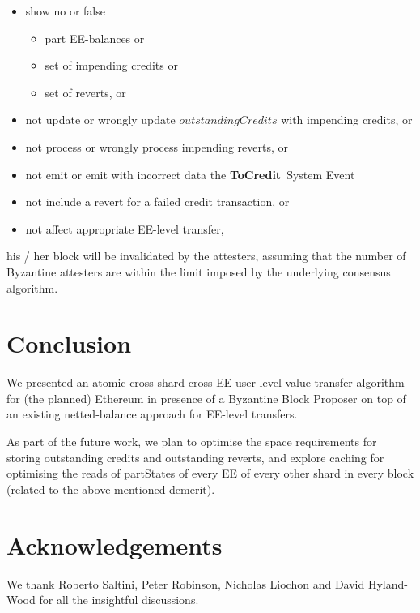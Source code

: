 \documentclass{IEEEtran}
\newcommand{\tocredit}[0]{{\bf ToCredit}~}
\begin{document}
\begin{itemize}
	\item show no or false 
	\begin{itemize}
		\item part EE-balances or
		\item set of impending credits or
		\item set of reverts, or
	\end{itemize}
	\item not update or wrongly update $outstandingCredits$ with impending credits, or
	\item not process or wrongly process impending reverts, or
	\item not emit or emit with incorrect data the \tocredit System Event
	\item not include a revert for a failed credit transaction, or
	\item not affect appropriate EE-level transfer,
\end{itemize}
his / her block will be invalidated by the attesters, assuming that the number of Byzantine attesters are within the limit imposed by the underlying consensus algorithm.

\section{Conclusion}
We presented an atomic cross-shard cross-EE user-level value transfer algorithm for (the planned) Ethereum in presence of a Byzantine Block Proposer on top of an existing netted-balance approach for EE-level transfers. 

As part of the future work, we plan to optimise the space requirements for storing outstanding credits and outstanding reverts, and explore caching for optimising the reads of partStates of every EE of every other shard in every block (related to the above mentioned demerit).

\section*{Acknowledgements}
We thank Roberto Saltini, Peter Robinson, Nicholas Liochon and David Hyland-Wood for all the insightful discussions.



\end{document}
